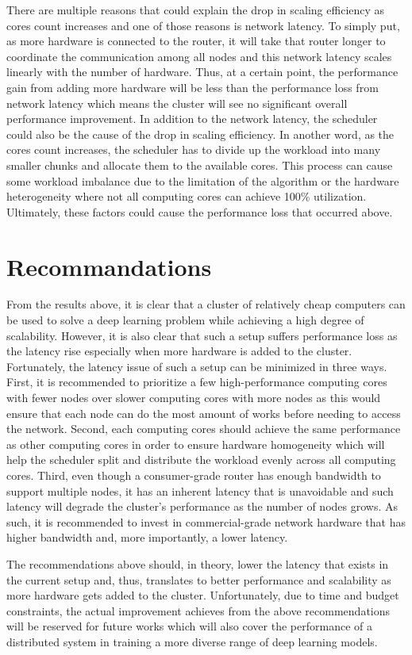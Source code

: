 \documentclass[conference]{IEEEtran}
\begin{document}
        There are multiple reasons that could explain the drop in scaling efficiency as cores count increases and one of those reasons is network latency. To simply put, as more hardware is connected to the router, it will take that router longer to coordinate the communication among all nodes and this network latency scales linearly with the number of hardware. Thus, at a certain point, the performance gain from adding more hardware will be less than the performance loss from network latency which means the cluster will see no significant overall performance improvement. In addition to the network latency, the scheduler could also be the cause of the drop in scaling efficiency. In another word, as the cores count increases, the scheduler has to divide up the workload into many smaller chunks and allocate them to the available cores. This process can cause some workload imbalance due to the limitation of the algorithm or the hardware heterogeneity where not all computing cores can achieve 100\% utilization. Ultimately, these factors could cause the performance loss that occurred above.              

    \section{Recommandations}
        From the results above, it is clear that a cluster of relatively cheap computers can be used to solve a deep learning problem while achieving a high degree of scalability. However, it is also clear that such a setup suffers performance loss as the latency rise especially when more hardware is added to the cluster. Fortunately, the latency issue of such a setup can be minimized in three ways. First, it is recommended to prioritize a few high-performance computing cores with fewer nodes over slower computing cores with more nodes as this would ensure that each node can do the most amount of works before needing to access the network. Second, each computing cores should achieve the same performance as other computing cores in order to ensure hardware homogeneity which will help the scheduler split and distribute the workload evenly across all computing cores. Third, even though a consumer-grade router has enough bandwidth to support multiple nodes, it has an inherent latency that is unavoidable and such latency will degrade the cluster's performance as the number of nodes grows. As such, it is recommended to invest in commercial-grade network hardware that has higher bandwidth and, more importantly, a lower latency. 
            
        The recommendations above should, in theory, lower the latency that exists in the current setup and, thus, translates to better performance and scalability as more hardware gets added to the cluster. Unfortunately, due to time and budget constraints, the actual improvement achieves from the above recommendations will be reserved for future works which will also cover the performance of a distributed system in training a more diverse range of deep learning models. 
        
        \nocite{*}

    
    
    
\end{document}
